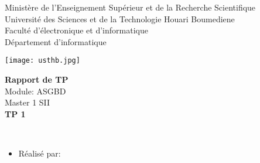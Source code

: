 \documentclass[12pt , a4paper]{report}
\begin{document}
\begin{center}
\normalsize{Ministère de l'Enseignement Supérieur et de la Recherche Scientifique}\\
\normalsize{Université des Sciences et de la Technologie Houari Boumediene}\\
\normalsize{Faculté d'électronique et d'informatique}\\
\normalsize{Département d'informatique}\\
\end{center}
\begin{center}
\texttt{[image: usthb.jpg]}
\end{center}


\begin{center}
\Huge{\textbf{Rapport de TP}}\\
\vspace{0.7cm}
\large{Module: ASGBD}\\
\vspace{0.2cm}
\large{Master 1 SII}\\
\vspace{1.5cm}
\normalsize{\textbf{TP 1}}
\end{center}
\vspace{3cm}
\\
\begin{itemize}
    \item{Réalisé par:}
\end{itemize}
\vspace{3cm}
\end{document}
